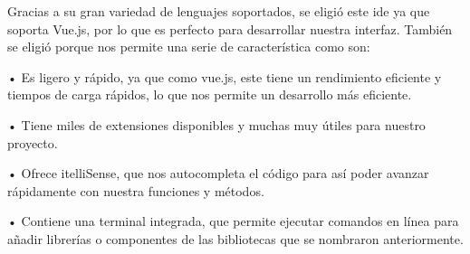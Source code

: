 Gracias a su gran variedad de lenguajes soportados, se eligió este ide ya que soporta Vue.js, por lo que es perfecto para desarrollar nuestra interfaz. También se eligió porque nos permite una serie de característica como son:
	
• Es ligero y rápido, ya que como vue.js, este tiene un rendimiento eficiente y tiempos de carga rápidos, lo que nos permite un desarrollo más eficiente.

• Tiene miles de extensiones disponibles y muchas muy útiles para nuestro proyecto.

• Ofrece itelliSense, que nos autocompleta el código para así poder avanzar rápidamente con nuestra funciones y métodos.

• Contiene una terminal integrada, que permite ejecutar comandos en línea para añadir librerías o componentes de las bibliotecas que se nombraron anteriormente.

